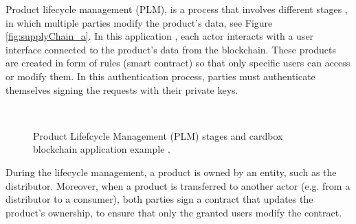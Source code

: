 Product lifecycle management (PLM), is a process that involves different stages \citep{stark2015product}, in which multiple parties modify the product's data, see Figure \ref{fig:supplyChain_a}. In this application \citep{abeyratne2016blockchain}, each actor interacts with a user interface connected to the product's data from the blockchain. These products are created in form of rules (smart contract) so that only specific users can access or modify them. In this authentication process, parties must authenticate themselves signing the requests with their private keys. 

\begin{figure}[bth]
	\myfloatalign
	 \quad
	 \\
	\caption{Product Lifefcycle Management (PLM) stages and cardbox blockchain application example \citep{stark2015product}.}
	\label{fig:supplyChain}
\end{figure}

During the lifecycle management, a product is owned by an entity, such as the distributor. Moreover, when a product is transferred to another actor (e.g. from a distributor to a consumer), both parties sign a contract that updates the product's ownership, to ensure that only the granted users modify the contract.

